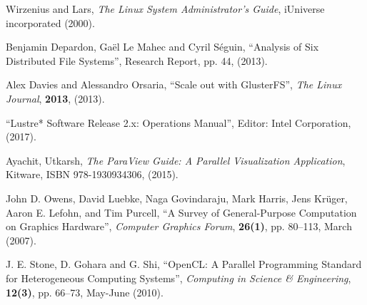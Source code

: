 \documentclass[twoside,a4paper,12pt,english]{inac19}
\begin{document}
\begin{thebibliography}{99}
 Wirzenius and Lars, \textit{The  Linux System Administrator's Guide}, iUniverse incorporated (2000).

 Benjamin Depardon, Ga\"{e}l Le Mahec and Cyril S\'{e}guin, ``Analysis of Six Distributed File Systems'', Research Report, pp. 44, (2013).
  
 Alex Davies and Alessandro Orsaria, ``Scale out with GlusterFS'', \textit{The Linux Journal}, \textbf{2013}, (2013).

 ``Lustre* Software Release 2.x: Operations Manual'', Editor: Intel Corporation, (2017).

 Ayachit, Utkarsh, \textit{The ParaView Guide: A Parallel Visualization Application}, Kitware, ISBN 978-1930934306, (2015).

    John D. Owens, David Luebke, Naga Govindaraju, Mark Harris, Jens Kr\"{u}ger, Aaron E. Lefohn, and Tim Purcell, ``A Survey of General-Purpose Computation on Graphics Hardware'', \textit{Computer Graphics Forum}, \textbf{26(1)}, pp. 80--113, March (2007).

   J. E. Stone, D. Gohara and G. Shi, ``OpenCL: A Parallel Programming Standard for Heterogeneous Computing Systems'', \textit{Computing in Science \& Engineering}, \textbf{12(3)}, pp. 66--73, May-June (2010).

\end{thebibliography}

%
%
\end{document}
